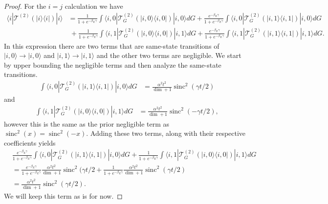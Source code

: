 \documentclass{article}
\newcommand{\ket}[1]{|#1\rangle}
\newcommand{\bra}[1]{\langle #1|}
\newcommand{\ketbra}[2]{| #1\rangle\! \langle #2|}
\DeclareMathOperator{\sinc}{sinc}
\begin{document}
\begin{proof}
    For the $i = j$ calculation we have
    \begin{align}
        \bra{i} \mathcal{T}^{(2)}(\ketbra{i}{i}) \ket{i} &= \frac{1}{1 + e^{-\beta_E \gamma}} \int \bra{i, 0} \mathcal{T}^{(2)}_G (\ketbra{i, 0}{i, 0}) \ket{i, 0} dG + \frac{e^{-\beta_E \gamma}}{1 + e^{-\beta_E \gamma}} \int \bra{i, 0} \mathcal{T}^{(2)}_G (\ketbra{i, 1}{i, 1}) \ket{i, 0} dG \nonumber \\
        &~+ \frac{1}{1 + e^{-\beta_E \gamma}} \int \bra{i, 1} \mathcal{T}^{(2)}_G (\ketbra{i, 0}{i, 0}) \ket{i, 1} dG + \frac{e^{-\beta_E \gamma}}{1 + e^{-\beta_E \gamma}} \int \bra{i, 1} \mathcal{T}^{(2)}_G (\ketbra{i, 1}{i, 1}) \ket{i, 1} dG . \label{eq:same_state_transition_with_env}
    \end{align}
    In this expression there are two terms that are same-state transitions of $\ket{i, 0} \to \ket{i, 0}$ and $\ket{i, 1} \to \ket{i,1}$ and the other two terms are negligible. We start by upper bounding the negligible terms and then analyze the same-state transitions.
    \begin{align}
        \int \bra{i, 0} \mathcal{T}^{(2)}_G (\ketbra{i, 1}{i, 1}) \ket{i, 0} dG &= \frac{\alpha^2 t^2}{\dim + 1} \sinc^2(\gamma t/ 2)
    \end{align}
    and 
    \begin{align}
        \int \bra{i, 1} \mathcal{T}^{(2)}_G (\ketbra{i, 0}{i, 0}) \ket{i, 1} dG &= \frac{\alpha^2 t^2}{\dim + 1} \sinc^2(-\gamma t/ 2),
    \end{align}
    however this is the same as the prior negligible term as $\sinc^2(x) = \sinc^2(-x)$. Adding these two terms, along with their respective coefficients yields
    \begin{align}
        &\frac{e^{-\beta_E \gamma}}{1 + e^{-\beta_E \gamma}} \int \bra{i, 0} \mathcal{T}^{(2)}_G (\ketbra{i, 1}{i, 1}) \ket{i, 0} dG + \frac{1}{1 + e^{-\beta_E \gamma}} \int \bra{i, 1} \mathcal{T}^{(2)}_G (\ketbra{i, 0}{i, 0}) \ket{i, 1} dG \\
        &= \frac{e^{-\beta_E \gamma}}{1 + e^{-\beta_E \gamma}} \frac{\alpha^2 t^2}{\dim + 1} \sinc^2(\gamma t/ 2 + \frac{1}{1 + e^{-\beta_E \gamma}}\frac{\alpha^2 t^2}{\dim + 1} \sinc^2(\gamma t/ 2) \\
        &= \frac{\alpha^2 t^2}{\dim + 1} \sinc^2(\gamma t/ 2). \label{eq:t_2_same_state_1}
    \end{align}
    We will keep this term as is for now. 


\end{proof}
\end{document}

